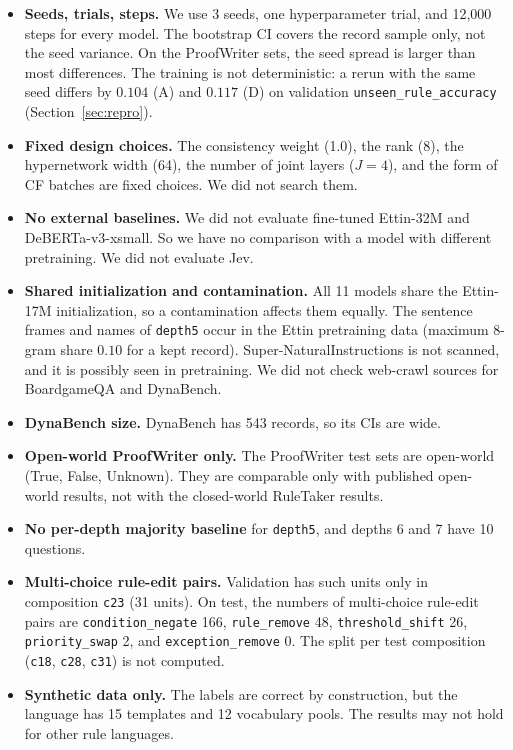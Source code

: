 \documentclass[11pt,a4paper]{article}
\newcommand{\ura}{\texttt{unseen\_\allowbreak rule\_\allowbreak accuracy}}
\begin{document}
\begin{itemize}
  \item \textbf{Seeds, trials, steps.} We use 3 seeds, one hyperparameter trial, and 12{,}000 steps for every model. The bootstrap CI covers the record sample only, not the seed variance. On the ProofWriter sets, the seed spread is larger than most differences. The training is not deterministic: a rerun with the same seed differs by $0.104$ (A) and $0.117$ (D) on validation \ura{} (Section~\ref{sec:repro}).
  \item \textbf{Fixed design choices.} The consistency weight (1.0), the rank (8), the hypernetwork width (64), the number of joint layers ($J = 4$), and the form of CF batches are fixed choices. We did not search them.
  \item \textbf{No external baselines.} We did not evaluate fine-tuned Ettin-32M and DeBERTa-v3-xsmall. So we have no comparison with a model with different pretraining. We did not evaluate Jev.
  \item \textbf{Shared initialization and contamination.} All 11 models share the Ettin-17M initialization, so a contamination affects them equally. The sentence frames and names of \texttt{depth5} occur in the Ettin pretraining data (maximum 8-gram share $0.10$ for a kept record). Super-NaturalInstructions is not scanned, and it is possibly seen in pretraining. We did not check web-crawl sources for BoardgameQA and DynaBench.
  \item \textbf{DynaBench size.} DynaBench has 543 records, so its CIs are wide.
  \item \textbf{Open-world ProofWriter only.} The ProofWriter test sets are open-world (True, False, Unknown). They are comparable only with published open-world results, not with the closed-world RuleTaker results.
  \item \textbf{No per-depth majority baseline} for \texttt{depth5}, and depths 6 and 7 have 10 questions.
  \item \textbf{Multi-choice rule-edit pairs.} Validation has such units only in composition \texttt{c23} (31 units). On test, the numbers of multi-choice rule-edit pairs are \texttt{condition\_negate} 166, \texttt{rule\_remove} 48, \texttt{threshold\_shift} 26, \texttt{priority\_swap} 2, and \texttt{exception\_remove} 0. The split per test composition (\texttt{c18}, \texttt{c28}, \texttt{c31}) is not computed.
  \item \textbf{Synthetic data only.} The labels are correct by construction, but the language has 15 templates and 12 vocabulary pools. The results may not hold for other rule languages.

\end{itemize}
\end{document}
